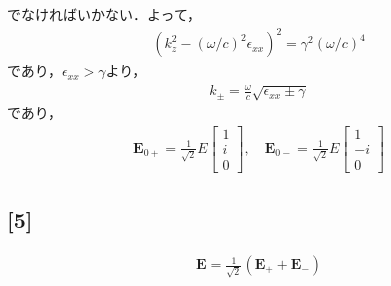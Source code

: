 \documentclass[12pt,dvipdfmx]{jsarticle}
\begin{document}
でなければいかない．よって，
\begin{eqnarray}
  (k_z^2- (\omega/c)^2\epsilon_{xx})^2 = \gamma^2 (\omega/c)^4
\end{eqnarray}
であり，$\epsilon_{xx}>\gamma$より，
\begin{eqnarray}
  k_{\pm} = \frac{\omega}{c}\sqrt{ \epsilon_{xx}\pm \gamma }
\end{eqnarray}
であり，
\begin{eqnarray}
  \bm{E}_{0+} = \frac{1}{\sqrt{2}}E
  \begin{bmatrix}
    1 \\
    i\\
    0
  \end{bmatrix}, \quad
  \bm{E}_{0-} = \frac{1}{\sqrt{2}}E
  \begin{bmatrix}
    1 \\
    -i\\
    0
  \end{bmatrix}
\end{eqnarray}
\subsection*{\large{[5]}}
\begin{eqnarray}
  \bm{E} = \frac{1}{\sqrt{2}}\left( \bm{E}_{+} + \bm{E}_{-} \right)
\end{eqnarray}
\end{document}
